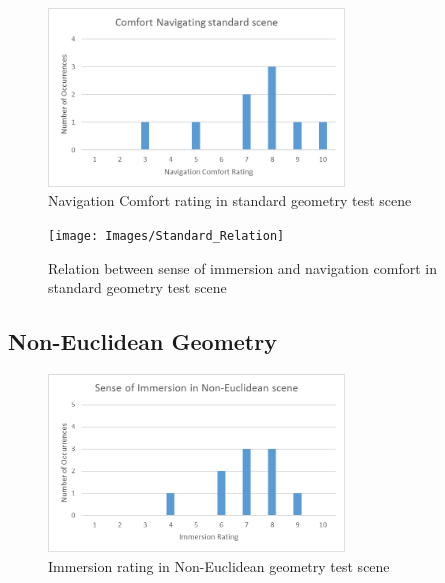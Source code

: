 			\begin{figure}
				\label{exp:fig:standard_comfort}
				\includegraphics[width=0.7\textwidth]{Images/Standard_Comfort}
				\centering
				\caption{Navigation Comfort rating in standard geometry test scene}
			\end{figure}

			\begin{figure}
				\label{exp:fig:standard_relation}
				\texttt{[image: Images/Standard\_Relation]}
				\centering
				\caption{Relation between sense of immersion and navigation comfort in standard geometry test scene}
			\end{figure}
			\begin{multicols*}{2}

		\subsection{Non-Euclidean Geometry}
		\label{exp:exp:ne}


			\end{multicols*}
			\begin{figure}
				\label{exp:fig:ne_immersion}
				\includegraphics[width=0.7\textwidth]{Images/NE_Immersion}
				\centering
				\caption{Immersion rating in Non-Euclidean geometry test scene}
			\end{figure}

